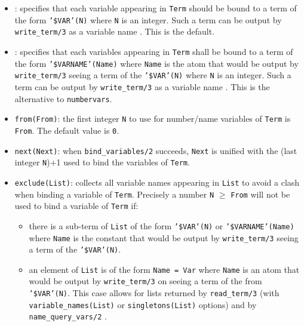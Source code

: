 \begin{itemize}

\item {}: specifies that each variable appearing in
\texttt{Term} should be bound to a term of the form \texttt{'\$VAR'(N)}
where \texttt{N} is an integer. Such a term can be output by
\texttt{write\_term/3} as a variable name . This is
the default.

\item {}: specifies that each variables appearing in
\texttt{Term} shall be bound to a term of the form
\texttt{'\$VARNAME'(Name)} where \texttt{Name} is the atom that would be
output by \texttt{write\_term/3} seeing a term of the \texttt{'\$VAR'(N)}
where \texttt{N} is an integer. Such a term can be output by
\texttt{write\_term/3} as a variable name . This is
the alternative to \texttt{numbervars}.

\item {}\texttt{from(From)}: the first integer \texttt{N} to use for
number/name variables of \texttt{Term} is \texttt{From}. The default value
is \texttt{0}.

\item {}\texttt{next(Next)}: when \texttt{bind\_variables/2} succeeds,
\texttt{Next} is unified with the (last integer \texttt{N})+1 used
to bind the variables of \texttt{Term}.

\item {}\texttt{exclude(List)}: collects all variable names appearing
in \texttt{List} to avoid a clash when binding a variable of \texttt{Term}.
Precisely a number \texttt{N} $\geq$ \texttt{From} will not be used to bind a
variable of \texttt{Term} if:

\begin{itemize}

\item there is a sub-term of \texttt{List} of the form \texttt{'\$VAR'(N)}
or \texttt{'\$VARNAME'(Name)} where \texttt{Name} is the constant that would
be output by \texttt{write\_term/3} seeing a term of the
\texttt{'\$VAR'(N)}.

\item an element of \texttt{List} is of the form \texttt{Name = Var} where
\texttt{Name} is an atom that would be output by \texttt{write\_term/3} on
seeing a term of the from \texttt{'\$VAR'(N)}. This case allows for lists
returned by \texttt{read\_term/3}
(with \texttt{variable\_names(List)} or
\texttt{singletons(List)} options)  and by
\texttt{name\_query\_vars/2} .

\end{itemize}

\end{itemize}

